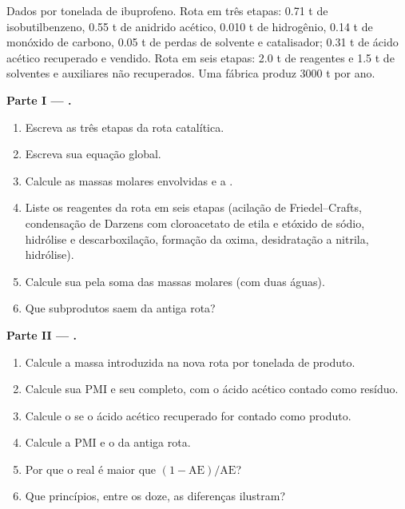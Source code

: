 \begin{problem}
\label{pb:b3:green-industrial:1}
Dados por tonelada de ibuprofeno. Rota em três etapas: 0.71 t de
isobutilbenzeno, 0.55 t de anidrido acético, 0.010 t de hidrogênio, 0.14 t de monóxido
de carbono, 0.05 t de perdas de solvente e catalisador; 0.31 t de ácido acético recuperado
e vendido. Rota em seis etapas: 2.0 t de reagentes e 1.5 t de solventes e auxiliares
não recuperados. Uma fábrica produz 3000 t por ano.

\medskip\noindent\textbf{Parte I --- .}
\begin{enumerate}
  \item Escreva as três etapas da rota catalítica.
  \item Escreva sua equação global.
  \item Calcule as massas molares envolvidas e a .
  \item Liste os reagentes da rota em seis etapas (acilação de Friedel--Crafts, condensação
        de Darzens com cloroacetato de etila e etóxido de sódio, hidrólise e
        descarboxilação, formação da oxima, desidratação a nitrila, hidrólise).
  \item Calcule sua  pela soma das massas molares (com duas águas).
  \item Que subprodutos saem da antiga rota?
\end{enumerate}

\medskip\noindent\textbf{Parte II --- .}
\begin{enumerate}[resume]
  \item Calcule a massa introduzida na nova rota por tonelada de produto.
  \item Calcule sua PMI e seu  completo, com o ácido acético contado como resíduo.
  \item Calcule o  se o ácido acético recuperado for contado como produto.
  \item Calcule a PMI e o  da antiga rota.
  \item Por que o  real é maior que $(1 - \mathrm{AE})/\mathrm{AE}$?
  \item Que princípios, entre os doze, as diferenças ilustram?
\end{enumerate}


\end{problem}
